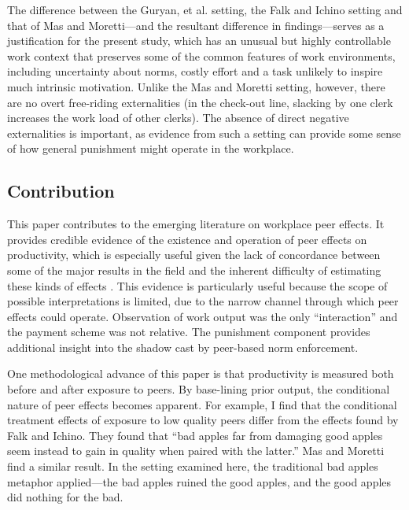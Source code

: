 \documentclass[12pt]{article}
\begin{document}
The difference between the Guryan, et al. setting, the Falk and Ichino
setting and that of Mas and Moretti---and the resultant difference in
findings---serves as a justification for the present study, which has
an unusual but highly controllable work context that preserves some of
the common features of work environments, including uncertainty about
norms, costly effort and a task unlikely to inspire much intrinsic
motivation. Unlike the Mas and Moretti setting, however, there are no
overt free-riding externalities (in the check-out line, slacking by
one clerk increases the work load of other clerks). The absence of
direct negative externalities is important, as evidence from such a
setting can provide some sense of how general punishment might operate
in the workplace.  

\subsection{Contribution} 
This paper contributes to the emerging literature on workplace peer
effects. It provides credible evidence of the existence and operation
of peer effects on productivity, which is especially useful given the
lack of concordance between some of the major results in the field and
the inherent difficulty of estimating these kinds of effects
\citep{manski1993}. This evidence is particularly useful because the
scope of possible interpretations is limited, due to the narrow
channel through which peer effects could operate. Observation of work
output was the only ``interaction'' and the payment scheme was not
relative. The punishment component provides additional insight into
the shadow cast by peer-based norm enforcement.

One methodological advance of this paper is that productivity is
measured both before and after exposure to peers. By base-lining prior
output, the conditional nature of peer effects becomes apparent.  For
example, I find that the conditional treatment effects of exposure to
low quality peers differ from the effects found by Falk and Ichino.
They found that ``bad apples far from damaging good apples seem
instead to gain in quality when paired with the latter.''  Mas and
Moretti find a similar result. In the setting examined here, the
traditional bad apples metaphor applied---the bad apples ruined the
good apples, and the good apples did nothing for the bad.
\end{document}
